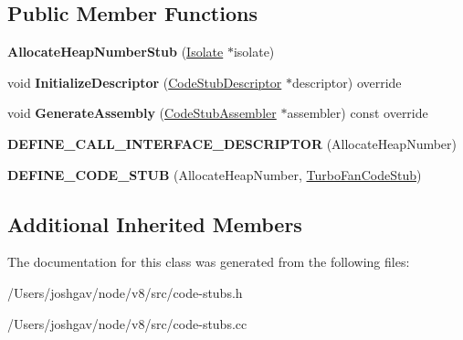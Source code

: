 \subsection*{Public Member Functions}
\begin{DoxyCompactItemize}
\item 
{\bfseries Allocate\+Heap\+Number\+Stub} (\hyperlink{classv8_1_1internal_1_1_isolate}{Isolate} $\ast$isolate)\hypertarget{classv8_1_1internal_1_1_allocate_heap_number_stub_ac285714f22f78a67883c629865140df3}{}\label{classv8_1_1internal_1_1_allocate_heap_number_stub_ac285714f22f78a67883c629865140df3}

\item 
void {\bfseries Initialize\+Descriptor} (\hyperlink{classv8_1_1internal_1_1_code_stub_descriptor}{Code\+Stub\+Descriptor} $\ast$descriptor) override\hypertarget{classv8_1_1internal_1_1_allocate_heap_number_stub_a155eddb4265ddd3d3e7b1c0f13ca5b3a}{}\label{classv8_1_1internal_1_1_allocate_heap_number_stub_a155eddb4265ddd3d3e7b1c0f13ca5b3a}

\item 
void {\bfseries Generate\+Assembly} (\hyperlink{classv8_1_1internal_1_1_code_stub_assembler}{Code\+Stub\+Assembler} $\ast$assembler) const  override\hypertarget{classv8_1_1internal_1_1_allocate_heap_number_stub_a52b84b91e9ae150affb006eb65072d57}{}\label{classv8_1_1internal_1_1_allocate_heap_number_stub_a52b84b91e9ae150affb006eb65072d57}

\item 
{\bfseries D\+E\+F\+I\+N\+E\+\_\+\+C\+A\+L\+L\+\_\+\+I\+N\+T\+E\+R\+F\+A\+C\+E\+\_\+\+D\+E\+S\+C\+R\+I\+P\+T\+OR} (Allocate\+Heap\+Number)\hypertarget{classv8_1_1internal_1_1_allocate_heap_number_stub_aed9342cc507778b8067e3373547f41ea}{}\label{classv8_1_1internal_1_1_allocate_heap_number_stub_aed9342cc507778b8067e3373547f41ea}

\item 
{\bfseries D\+E\+F\+I\+N\+E\+\_\+\+C\+O\+D\+E\+\_\+\+S\+T\+UB} (Allocate\+Heap\+Number, \hyperlink{classv8_1_1internal_1_1_turbo_fan_code_stub}{Turbo\+Fan\+Code\+Stub})\hypertarget{classv8_1_1internal_1_1_allocate_heap_number_stub_afccc06b0e8470c101e5db8c6b9908a44}{}\label{classv8_1_1internal_1_1_allocate_heap_number_stub_afccc06b0e8470c101e5db8c6b9908a44}

\end{DoxyCompactItemize}
\subsection*{Additional Inherited Members}


The documentation for this class was generated from the following files\+:\begin{DoxyCompactItemize}
\item 
/\+Users/joshgav/node/v8/src/code-\/stubs.\+h\item 
/\+Users/joshgav/node/v8/src/code-\/stubs.\+cc\end{DoxyCompactItemize}
